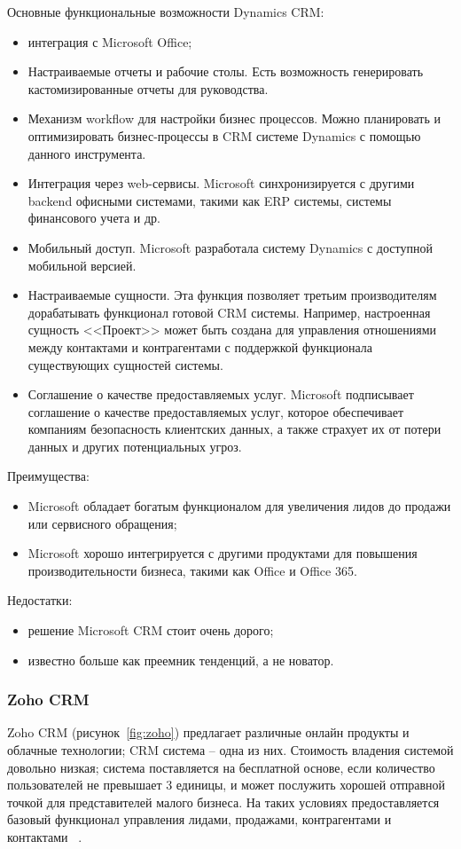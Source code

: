 Основные функциональные возможности Dynamics CRM:
\begin{itemize}
\item интеграция с Microsoft Office;
\item Настраиваемые отчеты и рабочие столы. Есть возможность генерировать кастомизированные отчеты для руководства.
\item Механизм workflow для настройки бизнес процессов. Можно планировать и оптимизировать бизнес-процессы в CRM системе Dynamics с помощью данного инструмента.
\item Интеграция через web-сервисы. Microsoft синхронизируется с другими backend офисными системами, такими как ERP системы, системы финансового учета и др.
\item Мобильный доступ. Microsoft разработала систему Dynamics с доступной мобильной версией.
\item Настраиваемые сущности. Эта функция позволяет третьим производителям дорабатывать функционал готовой CRM системы. Например, настроенная сущность <<Проект>> может быть создана для управления отношениями между контактами и контрагентами с поддержкой функционала существующих сущностей системы.
\item Соглашение о качестве предоставляемых услуг. Microsoft подписывает соглашение о качестве предоставляемых услуг, которое обеспечивает компаниям безопасность клиентских данных, а также страхует их от потери данных и других потенциальных угроз.
\end{itemize}

Преимущества: 
\begin{itemize}
\item Microsoft обладает богатым функционалом для увеличения лидов до продажи или сервисного обращения;
\item Microsoft хорошо интегрируется с другими продуктами для повышения производительности бизнеса, такими как Office и Office 365.
\end{itemize}

Недостатки: 
\begin{itemize}
\item решение Microsoft CRM стоит очень дорого;
\item известно больше как преемник тенденций, а не новатор.
\end{itemize}


\subsubsection{Zoho CRM }
\label{sub:alternatives:crm:zoho}
Zoho CRM (рисунок~\ref{fig:zoho}) предлагает различные онлайн продукты и облачные технологии; CRM система – одна из них. Стоимость владения системой довольно низкая; система поставляется на бесплатной основе, если количество пользователей не превышает 3 единицы, и может послужить хорошей отправной точкой для представителей малого бизнеса. На таких условиях предоставляется базовый функционал управления лидами, продажами, контрагентами и контактами ~\cite{zoho}. 

